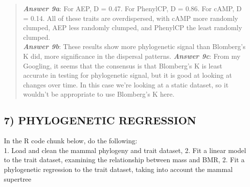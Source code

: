 \documentclass[]{article}
\begin{document}
\begin{quote}
\textbf{\emph{Answer 9a}}: For AEP, D = 0.47. For PhenylCP, D = 0.86.
For cAMP, D = 0.14. All of these traits are overdispersed, with cAMP
more randomly clumped, AEP less randomly clumped, and PhenylCP the least
randomly clumped.\\
\textbf{\emph{Answer 9b}}: These results show more phylogenetic signal
than Blomberg's K did, more significance in the dispersal patterns.
\textbf{\emph{Answer 9c}}: From my Googling, it seems that the consensus
is that Blomberg's K is least accurate in testing for phylogenetic
signal, but it is good at looking at changes over time. In this case
we're looking at a static dataset, so it wouldn't be appropriate to use
Blomberg's K here.
\end{quote}

\subsection{7) PHYLOGENETIC REGRESSION}\label{phylogenetic-regression}

In the R code chunk below, do the following:\\
1. Load and clean the mammal phylogeny and trait dataset, 2. Fit a
linear model to the trait dataset, examining the relationship between
mass and BMR, 2. Fit a phylogenetic regression to the trait dataset,
taking into account the mammal supertree
\end{document}
